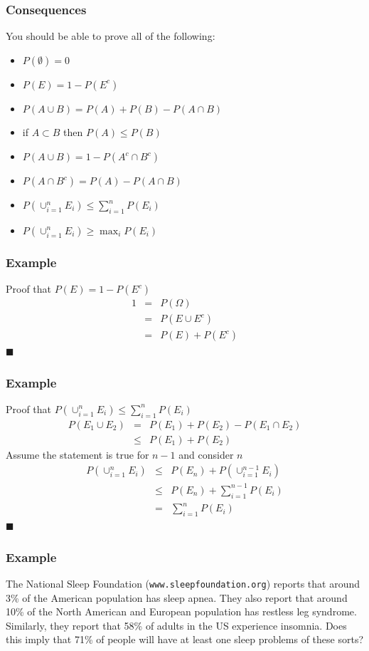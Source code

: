 \documentclass[aspectratio=169]{beamer}
\begin{document}
\begin{frame}
\frametitle{Consequences} 
You should be able to prove all of the following:
\begin{itemize}
\item $P(\emptyset) = 0$
\item $P(E) = 1 - P(E^c)$
\item $P(A \cup B) = P(A) + P(B) - P(A \cap B)$
\item if $A \subset B$ then $P(A) \leq P(B)$
\item $P\left(A \cup B\right) = 1 - P(A^c \cap B^c)$
\item $P(A \cap B^c) = P(A) - P(A \cap B)$
\item $P(\cup_{i=1}^n E_i) \leq \sum_{i=1}^n P(E_i)$
\item $P(\cup_{i=1}^n E_i) \geq \max_i P(E_i)$
\end{itemize}
\end{frame}

\begin{frame}
\frametitle{Example} 
Proof that $P(E) = 1 - P(E^c)$
\begin{eqnarray*}
1 & = & P(\Omega) \\
  & = & P(E \cup E^c)\\
  & = & P(E) + P(E^c)
\end{eqnarray*}
$\blacksquare$
\end{frame}

\begin{frame}
\frametitle{Example}
Proof that $P(\cup_{i=1}^n E_i) \leq \sum_{i=1}^n P(E_i)$\\
\begin{eqnarray*}
  P(E_1 \cup E_2) & =   & P(E_1) + P(E_2) - P(E_1 \cap E_2) \\
                  &\leq & P(E_1) + P(E_2)
\end{eqnarray*}
Assume the statement is true for $n-1$ and consider $n$
\begin{eqnarray*}
  P(\cup_{i=1}^n E_i) & \leq & P(E_n) + P(\cup_{i=1}^{n-1} E_i) \\
                      & \leq & P(E_n) + \sum_{i=1}^{n-1} P(E_i) \\
                      & =    & \sum_{i=1}^n P(E_i)
\end{eqnarray*}
$\blacksquare$
\end{frame}


\begin{frame}
\frametitle{Example} 
  The National Sleep Foundation (\texttt{www.sleepfoundation.org})
  reports that around 3\% of the American population has sleep
  apnea.  They also report that around 10\% of the North American
  and European population has restless leg syndrome. Similarly, they
  report that 58\% of adults in the US experience insomnia.  Does
  this imply that 71\% of people will have at least one sleep
  problems of these sorts?
\end{frame}
\end{document}
